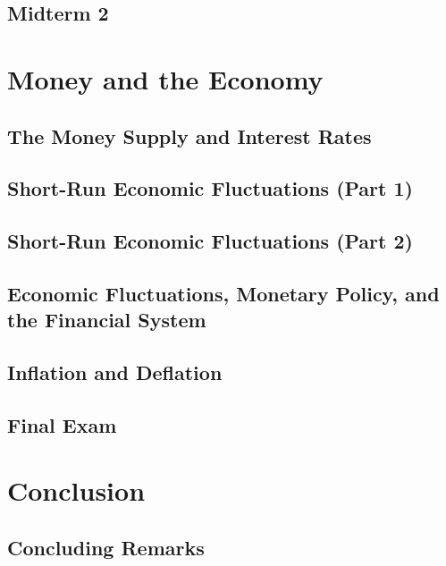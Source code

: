 \documentclass[
]{book}
\begin{document}
\hypertarget{midterm-2}{%
\chapter{\texorpdfstring{\textbf{Midterm 2}}{Midterm 2}}\label{midterm-2}}

\hypertarget{part-money-and-the-economy}{%
\part{Money and the Economy}\label{part-money-and-the-economy}}

\hypertarget{the-money-supply-and-interest-rates}{%
\chapter{The Money Supply and Interest Rates}\label{the-money-supply-and-interest-rates}}

\hypertarget{short-run-economic-fluctuations-part-1}{%
\chapter{Short-Run Economic Fluctuations (Part 1)}\label{short-run-economic-fluctuations-part-1}}

\hypertarget{short-run-economic-fluctuations-part-2}{%
\chapter{Short-Run Economic Fluctuations (Part 2)}\label{short-run-economic-fluctuations-part-2}}

\hypertarget{economic-fluctuations-monetary-policy-and-the-financial-system}{%
\chapter{Economic Fluctuations, Monetary Policy, and the Financial System}\label{economic-fluctuations-monetary-policy-and-the-financial-system}}

\hypertarget{inflation-and-deflation}{%
\chapter{Inflation and Deflation}\label{inflation-and-deflation}}

\hypertarget{final-exam}{%
\chapter*{\texorpdfstring{\textbf{Final Exam}}{Final Exam}}\label{final-exam}}

\hypertarget{part-conclusion}{%
\part{Conclusion}\label{part-conclusion}}

\hypertarget{concluding-remarks}{%
\chapter*{Concluding Remarks}\label{concluding-remarks}}

  
\end{document}
